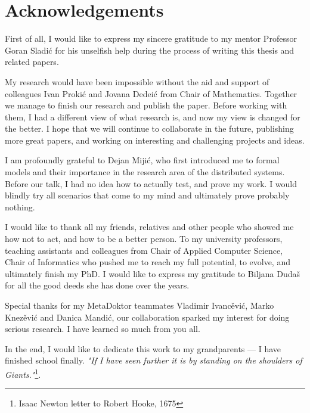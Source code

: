 \chapter*{Acknowledgements}
First of all, I would like to express my sincere gratitude to my mentor Professor Goran Sladi\'c for his unselfish help during the process of writing this thesis and related papers.

My research would have been impossible without the aid and support of colleagues Ivan Proki\'c and Jovana Dedei\'c from Chair of Mathematics. Together we manage to finish our research and publish the paper. Before working with them, I had a different view of what research is, and now my view is changed for the better. I hope that we will continue to collaborate in the future, publishing more great papers, and working on interesting and challenging projects and ideas.

I am profoundly grateful to Dejan Miji\'c, who first introduced me to formal models and their importance in the research area of the distributed systems. Before our talk, I had no idea how to actually test, and prove my work. I would blindly try all scenarios that come to my mind and ultimately prove probably nothing.

I would like to thank all my friends, relatives and other people who showed me how not to act, and how to be a better person. To my university professors, teaching assistants and colleagues from Chair of Applied Computer Science, Chair of Informatics who pushed me to reach my full potential, to evolve, and ultimately finish my PhD. I would like to express my gratitude to Biljana Duda\v s for all the good deeds she has done over the years.

Special thanks for my MetaDoktor teammates Vladimir Ivanc\v evi\'c, Marko Knez\v evi\'c and Danica Mandi\'c, our collaboration sparked my interest for doing serious research. I have learned so much from you all.

In the end, I would like to dedicate this work to my grandparents --- I have finished school finally. \emph{"If I have seen further it is by standing on the shoulders of Giants."}\footnote{Isaac Newton letter to Robert Hooke, 1675}.